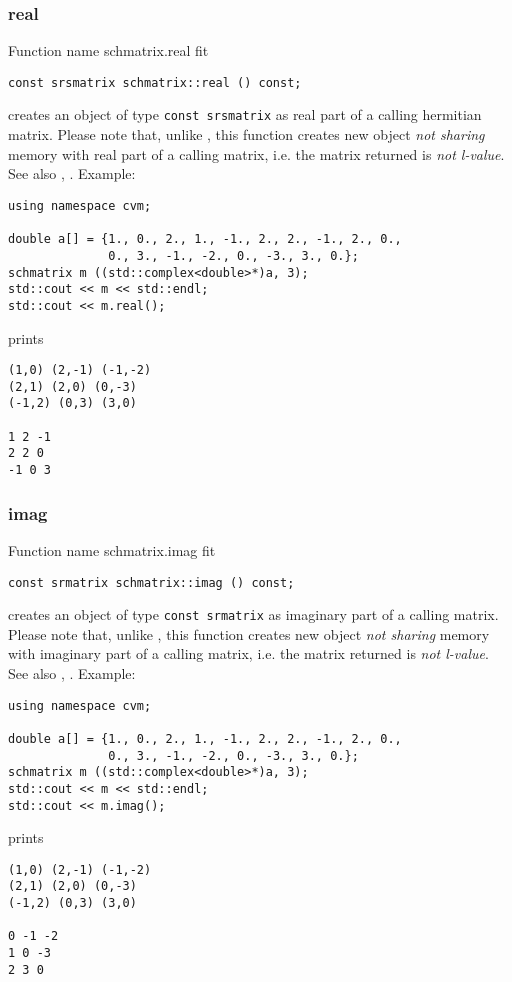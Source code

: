\subsubsection{real}
Function%
\pdfdest name {schmatrix.real} fit
\begin{verbatim}
const srsmatrix schmatrix::real () const;
\end{verbatim}
creates an object of type \verb"const srsmatrix"
as  real part
of a calling hermitian matrix.
Please note that, unlike
, this
function creates new object \emph{not sharing}  memory
with  real part of a calling matrix, i.e.
the matrix returned is \emph{not  l-value}.
See also
,
.
Example:
\begin{Verbatim}
using namespace cvm;

double a[] = {1., 0., 2., 1., -1., 2., 2., -1., 2., 0.,
              0., 3., -1., -2., 0., -3., 3., 0.};
schmatrix m ((std::complex<double>*)a, 3);
std::cout << m << std::endl;
std::cout << m.real();
\end{Verbatim}
prints
\begin{Verbatim}
(1,0) (2,-1) (-1,-2)
(2,1) (2,0) (0,-3)
(-1,2) (0,3) (3,0)

1 2 -1
2 2 0
-1 0 3
\end{Verbatim}
\newpage




\subsubsection{imag}
Function%
\pdfdest name {schmatrix.imag} fit
\begin{verbatim}
const srmatrix schmatrix::imag () const;
\end{verbatim}
creates an object of type \verb"const srmatrix"
as imaginary part
of a calling matrix.
Please note that, unlike
, this
function creates new object \emph{not sharing}  memory
with  imaginary part of a calling matrix, i.e.
the matrix returned is \emph{not  l-value}.
See also
,
.
Example:
\begin{Verbatim}
using namespace cvm;

double a[] = {1., 0., 2., 1., -1., 2., 2., -1., 2., 0.,
              0., 3., -1., -2., 0., -3., 3., 0.};
schmatrix m ((std::complex<double>*)a, 3);
std::cout << m << std::endl;
std::cout << m.imag();
\end{Verbatim}
prints
\begin{Verbatim}
(1,0) (2,-1) (-1,-2)
(2,1) (2,0) (0,-3)
(-1,2) (0,3) (3,0)

0 -1 -2
1 0 -3
2 3 0
\end{Verbatim}
\newpage



